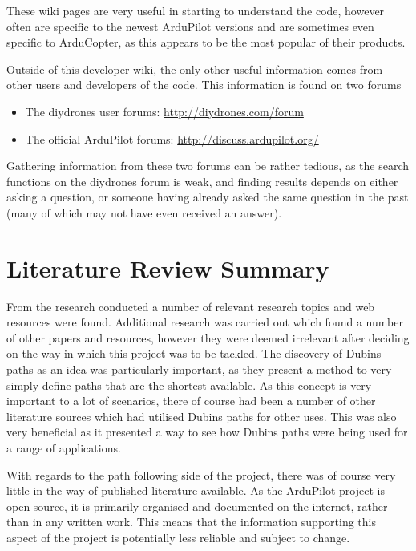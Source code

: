 These wiki pages are very useful in starting to understand the code, however often are specific to the newest ArduPilot versions and are sometimes even specific to ArduCopter, as this appears to be the most popular of their products. 

Outside of this developer wiki, the only other useful information comes from other users and developers of the code. This information is found on two forums

\begin{itemize}
	\item The diydrones user forums: \url{http://diydrones.com/forum}
	\item The official ArduPilot forums: \url{http://discuss.ardupilot.org/}
\end{itemize}

Gathering information from these two forums can be rather tedious, as the search functions on the diydrones forum is weak, and finding results depends on either asking a question, or someone having already asked the same question in the past (many of which may not have even received an answer). 

\section{Literature Review Summary}
\label{litrev:summary}

From the research conducted a number of relevant research topics and web resources were found. Additional research was carried out which found a number of other papers and resources, however they were deemed irrelevant after deciding on the way in which this project was to be tackled. The discovery of Dubins paths as an idea was particularly important, as they present a method to very simply define paths that are the shortest available. As this concept is very important to a lot of scenarios, there of course had been a number of other literature sources which had utilised Dubins paths for other uses. This was also very beneficial as it presented a way to see how Dubins paths were being used for a range of applications.

With regards to the path following side of the project, there was of course very little in the way of published literature available. As the ArduPilot project is open-source, it is primarily organised and documented on the internet, rather than in any written work. This means that the information supporting this aspect of the project is potentially less reliable and subject to change. 